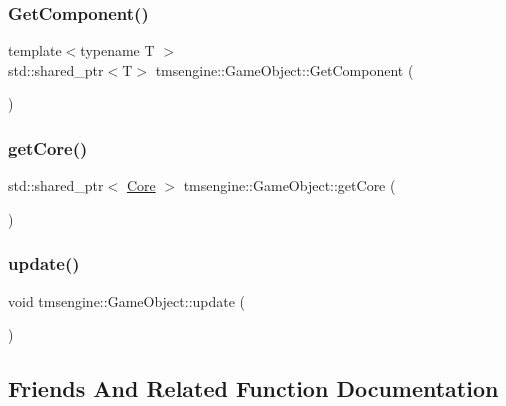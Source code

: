 \subsubsection{\texorpdfstring{Get\+Component()}{GetComponent()}}
{\footnotesize\ttfamily template$<$typename T $>$ \\
std\+::shared\+\_\+ptr$<$T$>$ tmsengine\+::\+Game\+Object\+::\+Get\+Component (\begin{DoxyParamCaption}{ }\end{DoxyParamCaption})\hspace{0.3cm}{\ttfamily [inline]}}

\mbox{\label{classtmsengine_1_1_game_object_abcaf58a2195a319064266cbac0bf74d6}} 
\subsubsection{\texorpdfstring{get\+Core()}{getCore()}}
{\footnotesize\ttfamily std\+::shared\+\_\+ptr$<$ \hyperlink{classtmsengine_1_1_core}{Core} $>$ tmsengine\+::\+Game\+Object\+::get\+Core (\begin{DoxyParamCaption}{ }\end{DoxyParamCaption})}

\mbox{\label{classtmsengine_1_1_game_object_adde904518de57fa132493e07b7b0cda7}} 
\subsubsection{\texorpdfstring{update()}{update()}}
{\footnotesize\ttfamily void tmsengine\+::\+Game\+Object\+::update (\begin{DoxyParamCaption}{ }\end{DoxyParamCaption})}



\subsection{Friends And Related Function Documentation}
\mbox{\label{classtmsengine_1_1_game_object_a4107254ac74f90d4f91e810d755b98c2}} 
